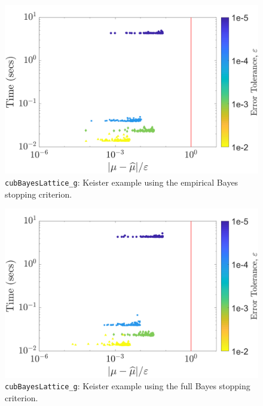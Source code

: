\documentclass{iitthesis}          %
\newcommand{\code}[1]{\texttt{#1}}
\begin{document}
\begin{figure}
	\centering
	\includegraphics[width=0.95\linewidth]{"Keister_guaranteed_time_MLE_C1sin_d4_r2_2018-Sep-6"}
	\caption[Keister guaranteed:MLE]{\code{cubBayesLattice\_g}: Keister example using the empirical Bayes stopping criterion.}
	\label{fig:keister-guaranteed-MLE}
\end{figure}
\begin{figure}
	\centering
	\includegraphics[width=0.95\linewidth]{"Keister_guaranteed_time_full_C1sin_d4_r2_2018-Sep-6"}
	\caption[Keister guaranteed:FB]{\code{cubBayesLattice\_g}: Keister example using the full Bayes stopping criterion.}
	\label{fig:keister-guaranteed-FB}
\end{figure}
\end{document}
